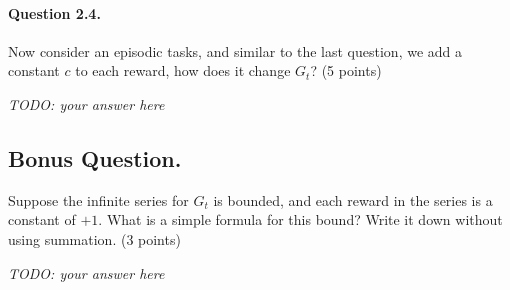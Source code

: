 \documentclass[a4paper,11pt]{article}
\begin{document}
\begin{minipage}{0.9\textwidth}
\vspace{.5cm}
\paragraph{Question 2.4.}
Now consider an episodic tasks, and similar to the last question, we add a constant $c$ to each reward, how does it change $G_t$?
(5 points)
\vspace{.5cm}

\textit{TODO: your answer here}

\end{minipage}

\subsection*{Bonus Question.}
Suppose the infinite series for $G_t$ is bounded, and each reward in the series is a constant of $+1$.
What is a simple formula for this bound? Write it down without using summation.
(3 points)
\vspace{.5cm}

\textit{TODO: your answer here}
\end{document}
